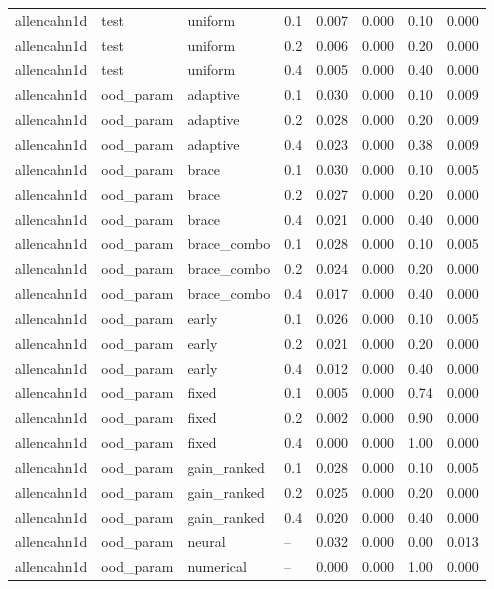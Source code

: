 \begin{longtable}{llllrrrr}
allencahn1d & test & uniform & 0.1 & 0.007 & 0.000 & 0.10 & 0.000 \\
allencahn1d & test & uniform & 0.2 & 0.006 & 0.000 & 0.20 & 0.000 \\
allencahn1d & test & uniform & 0.4 & 0.005 & 0.000 & 0.40 & 0.000 \\
\midrule
allencahn1d & ood\_param & adaptive & 0.1 & 0.030 & 0.000 & 0.10 & 0.009 \\
allencahn1d & ood\_param & adaptive & 0.2 & 0.028 & 0.000 & 0.20 & 0.009 \\
allencahn1d & ood\_param & adaptive & 0.4 & 0.023 & 0.000 & 0.38 & 0.009 \\
allencahn1d & ood\_param & brace & 0.1 & 0.030 & 0.000 & 0.10 & 0.005 \\
allencahn1d & ood\_param & brace & 0.2 & 0.027 & 0.000 & 0.20 & 0.000 \\
allencahn1d & ood\_param & brace & 0.4 & 0.021 & 0.000 & 0.40 & 0.000 \\
allencahn1d & ood\_param & brace\_combo & 0.1 & 0.028 & 0.000 & 0.10 & 0.005 \\
allencahn1d & ood\_param & brace\_combo & 0.2 & 0.024 & 0.000 & 0.20 & 0.000 \\
allencahn1d & ood\_param & brace\_combo & 0.4 & 0.017 & 0.000 & 0.40 & 0.000 \\
allencahn1d & ood\_param & early & 0.1 & 0.026 & 0.000 & 0.10 & 0.005 \\
allencahn1d & ood\_param & early & 0.2 & 0.021 & 0.000 & 0.20 & 0.000 \\
allencahn1d & ood\_param & early & 0.4 & 0.012 & 0.000 & 0.40 & 0.000 \\
allencahn1d & ood\_param & fixed & 0.1 & 0.005 & 0.000 & 0.74 & 0.000 \\
allencahn1d & ood\_param & fixed & 0.2 & 0.002 & 0.000 & 0.90 & 0.000 \\
allencahn1d & ood\_param & fixed & 0.4 & 0.000 & 0.000 & 1.00 & 0.000 \\
allencahn1d & ood\_param & gain\_ranked & 0.1 & 0.028 & 0.000 & 0.10 & 0.005 \\
allencahn1d & ood\_param & gain\_ranked & 0.2 & 0.025 & 0.000 & 0.20 & 0.000 \\
allencahn1d & ood\_param & gain\_ranked & 0.4 & 0.020 & 0.000 & 0.40 & 0.000 \\
allencahn1d & ood\_param & neural & -- & 0.032 & 0.000 & 0.00 & 0.013 \\
allencahn1d & ood\_param & numerical & -- & 0.000 & 0.000 & 1.00 & 0.000 \\

\end{longtable}
